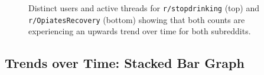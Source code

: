 \begin{figure}[b!]
\caption{Distinct users and active threads for \texttt{r/stop\-drinking} (top) and \texttt{r/Opiates\-Recovery} (bottom) showing that both counts are experiencing an upwards trend over time for both subreddits.} 

\label{fig:activity}
\end{figure}



\newpage
\subsection{Trends over Time: Stacked Bar Graph}


